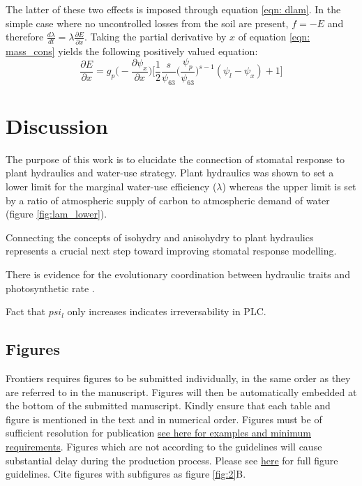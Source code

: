 \documentclass[utf8]{frontiersSCNS} %
\begin{document}
The latter of these two effects is imposed through equation \ref{eqn: dlam}. In the simple case where no uncontrolled losses from the soil are present, $f=-E$ and therefore $\frac{d\lambda}{dt}=\lambda \frac{\partial E}{\partial x}$. Taking the partial derivative by $x$ of equation \ref{eqn: mass_cons} yields the following positively valued equation:
\begin{equation}
    \frac{\partial E}{\partial x} = g_p \Big(-\frac{\partial \psi_x}{\partial x}\Big) \Big[\frac{1}{2} \frac{s}{\psi_{63}} \Big(\frac{\psi_p}{\psi_{63}}\Big)^{s-1} (\psi_l-\psi_x) + 1\Big]
\end{equation}


\section{Discussion}

The purpose of this work is to elucidate the connection of stomatal response to plant hydraulics and water-use strategy. Plant hydraulics was shown to set a lower limit for the marginal water-use efficiency ($\lambda$) whereas the upper limit is set by a ratio of atmospheric supply of carbon to atmospheric demand of water (figure \ref{fig:lam_lower}).

Connecting the concepts of isohydry and anisohydry to plant hydraulics represents a crucial next step toward improving stomatal response modelling. 

There is evidence for the evolutionary coordination between hydraulic traits and photosynthetic rate \citep{Scoffoni2016}. 

Fact that $psi_l$ only increases indicates irreversability in PLC.

\subsection{Figures}
Frontiers requires figures to be submitted individually, in the same order as they are referred to in the manuscript. Figures will then be automatically embedded at the bottom of the submitted manuscript. Kindly ensure that each table and figure is mentioned in the text and in numerical order. Figures must be of sufficient resolution for publication \href{http://home.frontiersin.org/about/author-guidelines#ResolutionRequirements}{see here for examples and minimum requirements}. Figures which are not according to the guidelines will cause substantial delay during the production process. Please see \href{http://home.frontiersin.org/about/author-guidelines#GeneralStyleGuidelinesforFigures}{here} for full figure guidelines. Cite figures with subfigures as figure \ref{fig:2}B.
\end{document}
